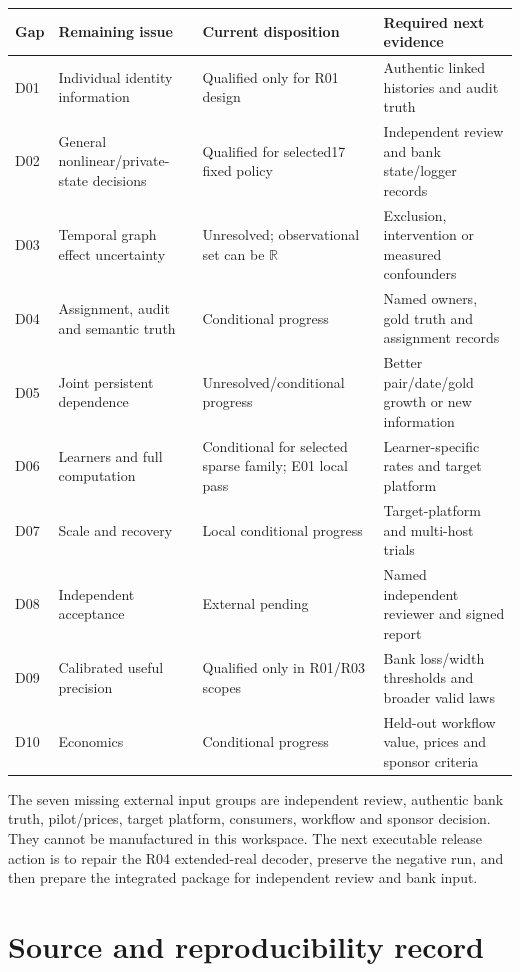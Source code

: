 \documentclass[11pt,a4paper]{article}
\newcommand{\R}{\mathbb R}
\begin{document}
\begin{longtable}{p{.08\linewidth}p{.29\linewidth}p{.22\linewidth}p{.29\linewidth}}
\toprule Gap & Remaining issue & Current disposition & Required next evidence\\
\midrule
D01 & Individual identity information & Qualified only for R01 design & Authentic linked histories and audit truth\\
D02 & General nonlinear/private-state decisions & Qualified for selected17 fixed policy & Independent review and bank state/logger records\\
D03 & Temporal graph effect uncertainty & Unresolved; observational set can be $\R$ & Exclusion, intervention or measured confounders\\
D04 & Assignment, audit and semantic truth & Conditional progress & Named owners, gold truth and assignment records\\
D05 & Joint persistent dependence & Unresolved/conditional progress & Better pair/date/gold growth or new information\\
D06 & Learners and full computation & Conditional for selected sparse family; E01 local pass & Learner-specific rates and target platform\\
D07 & Scale and recovery & Local conditional progress & Target-platform and multi-host trials\\
D08 & Independent acceptance & External pending & Named independent reviewer and signed report\\
D09 & Calibrated useful precision & Qualified only in R01/R03 scopes & Bank loss/width thresholds and broader valid laws\\
D10 & Economics & Conditional progress & Held-out workflow value, prices and sponsor criteria\\
\bottomrule
\end{longtable}

The seven missing external input groups are independent review, authentic bank
truth, pilot/prices, target platform, consumers, workflow and sponsor decision.
They cannot be manufactured in this workspace. The next executable release
action is to repair the R04 extended-real decoder, preserve the negative run,
and then prepare the integrated package for independent review and bank input.

\section{Source and reproducibility record}
\end{document}
